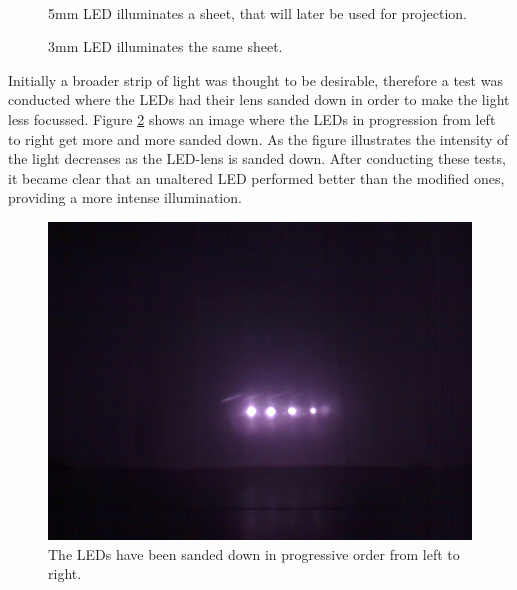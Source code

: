 \begin{figure}[htbp]
\begin{minipage}[b]{0.45\textwidth}
\end{minipage} \\ %
\begin{minipage}[t]{0.45\textwidth}
\caption{5mm LED illuminates a sheet, that will later be used for projection.} %
\label{fig:5_mm_test}
\end{minipage} \hfill
\begin{minipage}[t]{0.45\textwidth}
\caption{3mm LED illuminates the same sheet.} %
\label{fig:3_mm_led}
\end{minipage}
\end{figure}

Initially a broader strip of light was thought to be desirable, therefore a test was conducted where the LEDs had their lens sanded down in order to make the light less focussed. Figure \ref{fig:leds_sanded} shows an image where the LEDs in progression from left to right get more and more sanded down. As the figure illustrates the intensity of the light decreases as the LED-lens is sanded down. After conducting these tests,  it became clear that an unaltered LED performed better than the modified ones, providing a more intense illumination.

\begin{figure} [htbp]
\centering
\includegraphics[width=1.00\textwidth]{Pictures/Theory/sanded_leds.jpg}
\caption{The LEDs have been sanded down in progressive order from left to right.}
\label{fig:leds_sanded}
\end{figure}

